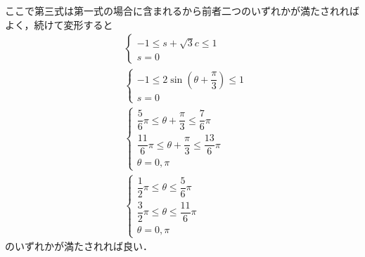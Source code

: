 \documentclass[../../main.tex]{subfiles}
\begin{document}
ここで第三式は第一式の場合に含まれるから前者二つのいずれかが満たされればよく，続けて変形すると
\begin{align}
  &
  \begin{cases}
    -1 \le s + \sqrt{3}c \le 1 \\
    s = 0
  \end{cases} \\
  &
  \begin{cases}
    -1 \le 2\sin\left(\theta+\dfrac{\pi}{3}\right) \le 1 \\
    s = 0
  \end{cases}\\
  &
  \begin{cases}
    \dfrac{5}{6}\pi \le \theta + \dfrac{\pi}{3} \le \dfrac{7}{6}\pi \\
    \dfrac{11}{6}\pi \le \theta + \dfrac{\pi}{3} \le \dfrac{13}{6}\pi \\
    \theta = 0, \pi
  \end{cases}\\
  &
  \begin{cases}
    \dfrac{1}{2}\pi \le \theta \le \dfrac{5}{6}\pi \\
    \dfrac{3}{2}\pi \le \theta \le \dfrac{11}{6}\pi \\
    \theta = 0, \pi
  \end{cases}
\end{align}
のいずれかが満たされれば良い．
\end{document}
